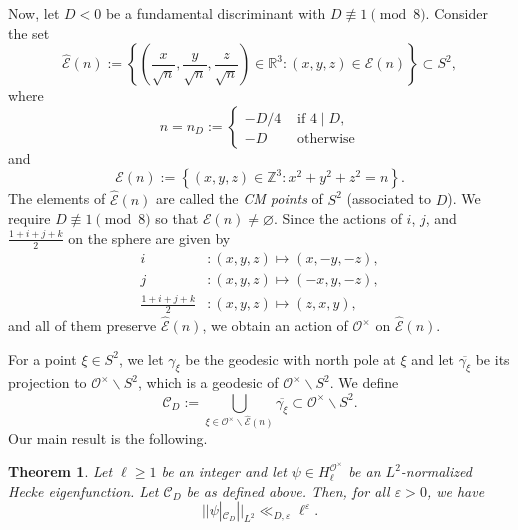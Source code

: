 \documentclass[11pt]{amsart}
\newcommand{\bigo}{\mathcal{O}}
\newcommand{\R}{\mathbb{R}}
\newcommand{\Z}{\mathbb{Z}}
\newtheorem{theorem}{Theorem}[section]
\theoremstyle{definition}
\theoremstyle{remark}
\begin{document}
Now, let $D<0$ be a fundamental discriminant with $D\not\equiv 1 \pmod{8}$. Consider the set $$ \widehat{\mathcal{E}}(n) := \left\{ \left( \frac{x}{\sqrt{n}}, \frac{y}{\sqrt{n}}, \frac{z}{\sqrt{n}} \right) \in \R^3 : (x,y,z) \in \mathcal{E}(n) \right\} \subset S^2,$$ where 
\begin{equation*}
    n = n_D := \begin{cases}
        -D/4 & \text{ if } 4\mid D, \\
        -D & \text{ otherwise}
    \end{cases}    
\end{equation*}
and $$ \mathcal{E}(n) := \left\{ (x,y,z)\in \Z^3 : x^2 + y^2 + z^2 = n \right\}.$$ The elements of $\widehat{\mathcal{E}}(n)$ are called the \textit{CM points} of $S^2$ (associated to $D$). We require $D\not\equiv 1 \pmod{8}$ so that $\mathcal{E}(n) \neq \varnothing$. Since the actions of $i$, $j$, and $\frac{1+i+j+k}{2}$ on the sphere are given by
\begin{align*}
    i &: (x,y,z) \mapsto (x,-y,-z), \\
    j &: (x,y,z) \mapsto (-x,y,-z), \\
    \frac{1+i+j+k}{2} &: (x,y,z) \mapsto (z,x,y),
\end{align*}
and all of them preserve $\widehat{\mathcal{E}}(n)$, we obtain an action of $\bigo^{\times}$ on $\widehat{\mathcal{E}}(n)$. 

For a point $\xi \in S^2$, we let $\gamma_\xi$ be the geodesic with north pole at $\xi$ and let $\overline{\gamma_{\xi}}$ be its projection to $\bigo^{\times} \backslash S^2$, which is a geodesic of $\bigo^{\times} \backslash S^2$. We define $$ \mathcal{C}_{D} := \bigcup_{\xi \in \bigo^{\times} \backslash \widehat{\mathcal{E}}(n)} \overline{\gamma_{\xi}} \subset \bigo^{\times} \backslash S^2.$$ Our main result is the following.

\begin{theorem}\label{MainTheorem}
Let $\ell\geq 1$ be an integer and let $\psi\in H_{\ell}^{\bigo^{\times}}$ be an $L^2$-normalized Hecke eigenfunction. Let $\mathcal{C}_{D}$ be as defined above. Then, for all $\varepsilon>0$, we have 
\begin{equation}
    ||\psi|_{\mathcal{C}_{D}}||_{L^2} \ll_{D,\varepsilon} \ell^{\varepsilon}. \label{MainTheorem-eq1}
\end{equation}
\end{theorem}
\end{document}
